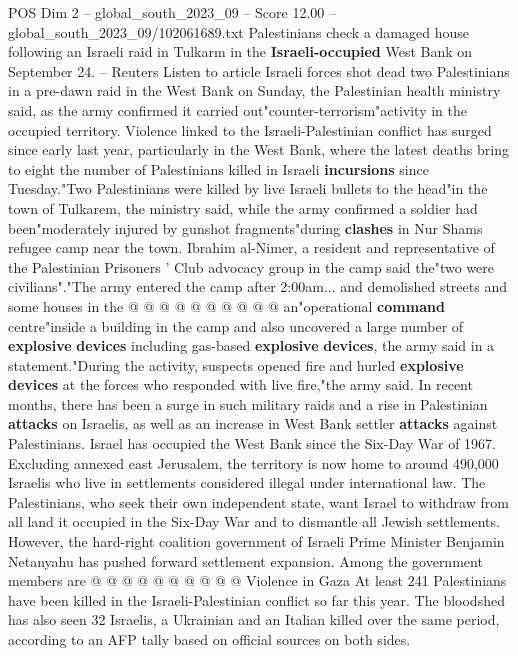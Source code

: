 \begin{textsample}{POS Dim 2 – global\_south\_2023\_09 – Score 12.00 – global\_south\_2023\_09/102061689.txt}  \label{ex:f2_pos_441}
Palestinians check a damaged house following an Israeli raid in Tulkarm in the \textbf{Israeli-occupied} West Bank on September 24. -- Reuters Listen to article Israeli forces shot dead two Palestinians in a pre-dawn raid in the West Bank on Sunday, the Palestinian health ministry said, as the army confirmed it carried out"counter-terrorism"activity in the occupied territory.
Violence linked to the Israeli-Palestinian conflict has surged since early last year, particularly in the West Bank, where the latest deaths bring to eight the number of Palestinians killed in Israeli \textbf{incursions} since Tuesday."Two Palestinians were killed by live Israeli bullets to the head"in the town of Tulkarem, the ministry said, while the army confirmed a soldier had been"moderately injured by gunshot fragments"during \textbf{clashes} in Nur Shams refugee camp near the town.
Ibrahim al-Nimer, a resident and representative of the Palestinian Prisoners ' Club advocacy group in the camp said the"two were civilians"."The army entered the camp after 2:00am... and demolished streets and some houses in the @ @ @ @ @ @ @ @ @ @ an"operational \textbf{command} centre"inside a building in the camp and also uncovered a large number of \textbf{explosive} \textbf{devices} including gas-based \textbf{explosive} \textbf{devices}, the army said in a statement."During the activity, suspects opened fire and hurled \textbf{explosive} \textbf{devices} at the forces who responded with live fire,"the army said.
In recent months, there has been a surge in such military raids and a rise in Palestinian \textbf{attacks} on Israelis, as well as an increase in West Bank settler \textbf{attacks} against Palestinians.
Israel has occupied the West Bank since the Six-Day War of 1967.
Excluding annexed east Jerusalem, the territory is now home to around 490,000 Israelis who live in settlements considered illegal under international law.
The Palestinians, who seek their own independent state, want Israel to withdraw from all land it occupied in the Six-Day War and to dismantle all Jewish settlements.
However, the hard-right coalition government of Israeli Prime Minister Benjamin Netanyahu has pushed forward settlement expansion.
Among the government members are @ @ @ @ @ @ @ @ @ @ Violence in Gaza At least 241 Palestinians have been killed in the Israeli-Palestinian conflict so far this year.
The bloodshed has also seen 32 Israelis, a Ukrainian and an Italian killed over the same period, according to an AFP tally based on official sources on both sides.

\end{textsample}
